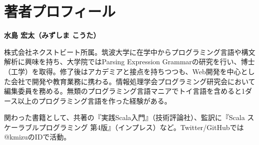 \chapter*{著者プロフィール}\label{author}

\noindent
\textbf{水島 宏太（みずしま こうた）}

株式会社ネクストビート所属。筑波大学に在学中からプログラミング言語や構文解析に興味を持ち、大学院ではParsing Expression Grammarの研究を行い、博士（工学）を取得。修了後はアカデミアと接点を持ちつつも、Web開発を中心とした会社で開発や教育業務に携わる。情報処理学会プログラミング研究会において編集委員を務める。無類のプログラミング言語マニアでトイ言語を含めると1ダース以上のプログラミング言語を作った経験がある。

関わった書籍として、共著の『実践Scala入門』（技術評論社）、監訳に『Scala スケーラブルプログラミング 第4版』（インプレス）など。Twitter/GitHubでは@kmizuのIDで活動。
